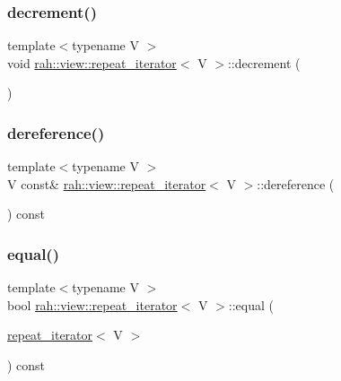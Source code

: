 \mbox{\label{structrah_1_1view_1_1repeat__iterator_ae3ed58503233856a54f9dfcf662edaf6}} 
\subsubsection{\texorpdfstring{decrement()}{decrement()}}
{\footnotesize\ttfamily template$<$typename V $>$ \\
void \mbox{\hyperlink{structrah_1_1view_1_1repeat__iterator}{rah\+::view\+::repeat\+\_\+iterator}}$<$ V $>$\+::decrement (\begin{DoxyParamCaption}{ }\end{DoxyParamCaption})\hspace{0.3cm}{\ttfamily [inline]}}

\mbox{\label{structrah_1_1view_1_1repeat__iterator_a0b1fbfa1670a227d4d129dcdb9a549e8}} 
\subsubsection{\texorpdfstring{dereference()}{dereference()}}
{\footnotesize\ttfamily template$<$typename V $>$ \\
V const\& \mbox{\hyperlink{structrah_1_1view_1_1repeat__iterator}{rah\+::view\+::repeat\+\_\+iterator}}$<$ V $>$\+::dereference (\begin{DoxyParamCaption}{ }\end{DoxyParamCaption}) const\hspace{0.3cm}{\ttfamily [inline]}}

\mbox{\label{structrah_1_1view_1_1repeat__iterator_ab42103684163bf38275999ff908d3113}} 
\subsubsection{\texorpdfstring{equal()}{equal()}}
{\footnotesize\ttfamily template$<$typename V $>$ \\
bool \mbox{\hyperlink{structrah_1_1view_1_1repeat__iterator}{rah\+::view\+::repeat\+\_\+iterator}}$<$ V $>$\+::equal (\begin{DoxyParamCaption}\item[{\mbox{\hyperlink{structrah_1_1view_1_1repeat__iterator}{repeat\+\_\+iterator}}$<$ V $>$}]{ }\end{DoxyParamCaption}) const\hspace{0.3cm}{\ttfamily [inline]}}


